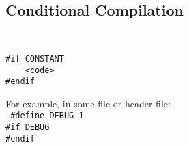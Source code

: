 \documentclass{article}
\begin{document}
\subsection{Conditional Compilation}
{\tt 
\begin{verbatim}
#if CONSTANT
    <code>
#endif
\end{verbatim}}
For example, in some file or header file:\\
{\tt
\#define DEBUG 1\\
\#if DEBUG\\
\#endif\\
}
\end{document}
